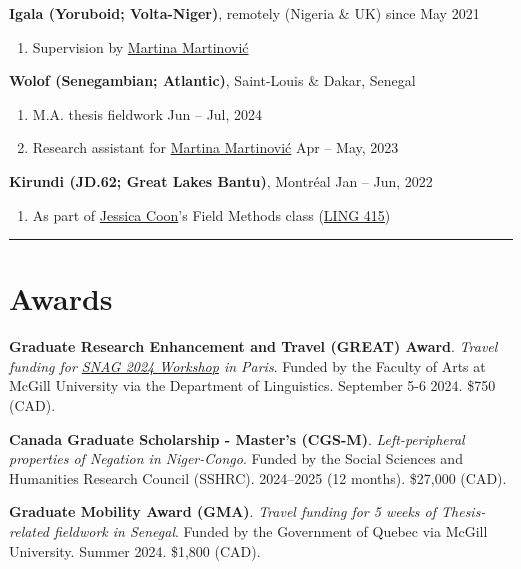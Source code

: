 \documentclass[margin,line]{resume}
\begin{document}
\begin{resume}
	\textbf{Igala (Yoruboid; Volta-Niger)}, remotely (Nigeria \& UK) \hfill since May 2021
	\begin{enumerate}[-, leftmargin=1em, topsep=0.5pt]
		\item[] Supervision by \href{https://inamartinovic.com/}{Martina Martinović}
	\end{enumerate}


	\textbf{Wolof (Senegambian; Atlantic)}, Saint-Louis \& Dakar, Senegal %
	\begin{enumerate}[-, leftmargin=1em, topsep=0.5pt]
		\item[] M.A. thesis fieldwork \hfill Jun -- Jul, 2024
		\item[] Research assistant for \href{https://inamartinovic.com/}{Martina Martinović} \hfill Apr -- May, 2023
	\end{enumerate}

	\textbf{Kirundi (JD.62; Great Lakes Bantu)}, Montréal \hfill Jan -- Jun, 2022
	\begin{enumerate}[-, leftmargin=1em, topsep=0.5pt]
		\item[] As part of \href{https://jessica.lingspace.org/}{Jessica Coon}'s Field Methods class (\href{https://www.mcgill.ca/study/2021-2022/courses/ling-415}{LING 415})
	\end{enumerate}

	\vspace{-0.9em}\rule{\textwidth}{0.4pt}


	\section{\mysidestyle Awards}

	
	{\textbf{Graduate Research Enhancement and Travel (GREAT) Award}. \textit{Travel funding for \href{https://parissnag.com/conf}{SNAG 2024 Workshop} in Paris}. Funded by the Faculty of Arts at McGill University via the Department of Linguistics. September 5-6 2024. \$750 (CAD).}

	{\textbf{Canada Graduate Scholarship - Master's (CGS-M)}. \textit{Left-peripheral properties of Negation in Niger-Congo}. Funded by the Social Sciences and Humanities Research Council (SSHRC). 2024--2025 (12 months). \$27,000 (CAD).}
	
	{\textbf{Graduate Mobility Award (GMA)}. \textit{Travel funding for 5 weeks of Thesis-related fieldwork in Senegal}. Funded by the Government of Quebec via McGill University. %
	Summer 2024. \$1,800 (CAD).}	
	

\end{resume}
\end{document}
